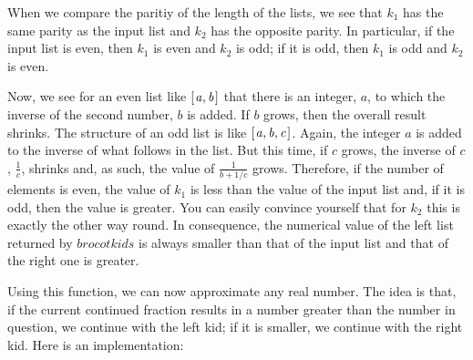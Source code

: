 \documentclass[tikz]{scrreprt}
\newcommand{\Varid}[1]{\mathit{#1}}
\begin{document}
When we compare the paritiy of 
the length of the lists,
we see that $k_1$ has the same parity as the input list 
and $k_2$ has the opposite parity.
In particular, if the input list is even,
then $k_1$ is even and $k_2$ is odd; if it is odd,
then $k_1$ is odd and $k_2$ is even.

Now, we see for an even list like \ensuremath{[\mskip1.5mu \Varid{a},\Varid{b}\mskip1.5mu]} that there is an 
integer, $a$, to which the inverse of the second number,
$b$ is added. If $b$ grows, then the overall result shrinks.
The structure of an odd list is like \ensuremath{[\mskip1.5mu \Varid{a},\Varid{b},\Varid{c}\mskip1.5mu]}.
Again, the integer $a$ is added to the inverse of
what follows in the list.
But this time, if $c$ grows, the inverse of $c$,
$\frac{1}{c}$, shrinks and, as such, the value of
$\frac{1}{b+1/c}$ grows.
Therefore, if the number of elements is even,
the value of $k_1$ is less than the value of the input list
and, if it is odd, then the value is greater.
You can easily convince yourself that for $k_2$
this is exactly the other way round.
In consequence, the numerical value of 
the left list returned by \ensuremath{\Varid{brocotkids}}
is always smaller than that of the input list
and that of the right one is greater.

Using this function, we can now approximate any real number.
The idea is that, if the current continued fraction
results in a number greater than the number in question, we
continue with the left kid; if it is smaller,
we continue with the right kid. Here is an implementation:
\end{document}
